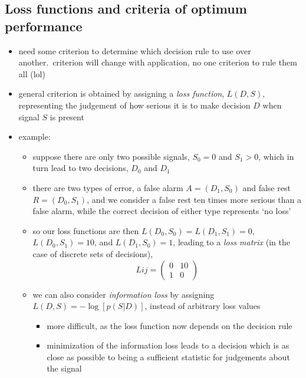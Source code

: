 \documentclass[../jaynes_prob_theory_notes.tex]{subfiles}
\begin{document}
        \subsection{Loss functions and criteria of optimum performance}
            \begin{itemize} 
                \item need some criterion to determine which decision rule to use over another.\ criterion will change with application, no one criterion to rule them all (lol)
                \item general criterion is obtained by assigning a \textit{loss function}, \(L(D,S)\), representing the judgement of how serious it is to make decision \(D\) when signal \(S\) is present
                \item example:
                    \begin{itemize} 
                        \item suppose there are only two possible signals, \(S_0 = 0\) and \(S_1 > 0\), which in turn lead to two decisions, \(D_0\) and \(D_1\)
                        \item there are two types of error, a false alarm \(A = (D_1, S_0)\) and false rest \(R = (D_0, S_1)\), and we consider a false rest ten times more serious than a false alarm, while the correct decision of either type represents `no loss'
                        \item so our loss functions are then \(L(D_0, S_0) = L(D_1, S_1) = 0\), \(L(D_0, S_1) = 10\), and \(L(D_1, S_0) = 1\), leading to a \textit{loss matrix} (in the case of discrete sets of decisions),
                            \begin{equation*} 
                                L{ij} = \left( \begin{matrix} 0 & 10 \\ 1 & 0 \end{matrix} \right)
                            \end{equation*}
                        \item we can also consider \textit{information loss} by assigning \(L(D,S) = -\log [p(S|D)]\), instead of arbitrary loss values
                            \begin{itemize} 
                                \item more difficult, as the loss function now depends on the decision rule
                                \item minimization of the information loss leads to a decision which is as close as possible to being a sufficient statistic for judgements about the signal

\end{itemize}
\end{itemize}
\end{itemize}
\end{document}
